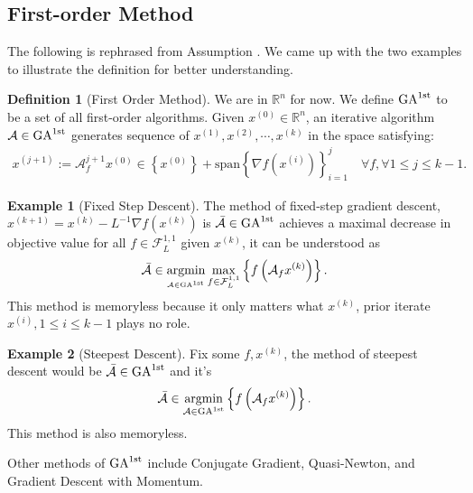 \documentclass[]{article}
\theoremstyle{definition}
\newtheorem{definition}{Definition}
\newtheorem{exmp}{Example}[section]
\numberwithin{equation}{subsection}
\begin{document}
    \subsection{First-order Method}
        The following is rephrased from Assumption \cite[2.1.4]{nesterov_lecture_2018}. 
        We came up with the two examples to illustrate the definition for better understanding. 
        \begin{definition}[First Order Method]
            We are in $\mathbb R^n$ for now.
            We define $\text{GA}^{\text{1st}}$ to be a set of all first-order algorithms.
            Given $x^{(0)} \in \mathbb R^n$, an iterative algorithm $\mathcal A \in \text{GA}^{\text{1st}}$ generates sequence of $x^{(1)}, x^{(2)}, \cdots, x^{(k)}$ in the space satisfying:
            \begin{align*}
                 x^{(j + 1)}:= \mathcal A_f^{j + 1}x^{(0)} \in \left\{x^{(0)}\right\} + 
                \text{span}\left\{\nabla f\left(x^{(i)}\right)\right\}_{i = 1}^{j} \quad \forall f, \forall 1\le j \le k -1. 
            \end{align*}
        \end{definition}
        \begin{exmp}[Fixed Step Descent]
            The method of fixed-step gradient descent, $x^{(k + 1)} = x^{(k)} - L^{-1}\nabla f(x^{(k)})$ is $ \bar {\mathcal A}\in \text{GA}^{\text{1st}}$ achieves a maximal decrease in objective value for all $f\in \mathcal F_{L}^{1, 1}$ given $x^{(k)}$, it can be understood as 
            \[
                \bar {\mathcal A} \in 
                \underset{_{\mathcal A\in \text{GA}^{\text{1st}}}}{\text{argmin}}
                \max_{f\in \mathcal F_L^{1, 1}} \left\lbrace
                    f\left(
                        \mathcal A_f x^{(k)}
                    \right)
                \right\rbrace. 
            \]
            This method is memoryless because it only matters what $x^{(k)}$, prior iterate $x^{(i)}, 1\le i \le k-1$ plays no role. 
        \end{exmp}
        
        \begin{exmp}[Steepest Descent]
            Fix some $f, x^{(k)}$, the method of steepest descent would be $\bar {\mathcal A}\in \text{GA}^{\text{1st}}$ and it's 
            \[
                \bar {\mathcal A}\in  \underset{\mathcal A \in \text{GA}^{\text{1st}}}{\text{argmin}}
                \left\lbrace
                    f\left(
                        \mathcal A_f x^{(k)}
                    \right)
                \right\rbrace. 
            \]
            This method is also memoryless.     
        \end{exmp}
        Other methods of $\text{GA}^{\text{1st}}$ include Conjugate Gradient, Quasi-Newton, and Gradient Descent with Momentum. 
\end{document}
